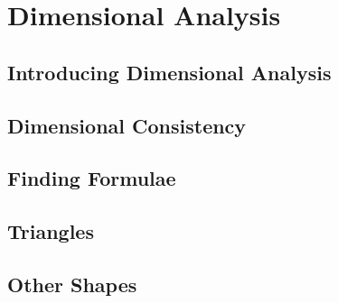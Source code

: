 \documentclass[../alevelmaths.tex]{subfiles}
\begin{document}
\chapter{Dimensional Analysis}
\section{Introducing Dimensional Analysis}
\section{Dimensional Consistency}
\section{Finding Formulae}
\section{Triangles}
\section{Other Shapes}
\end{document}
